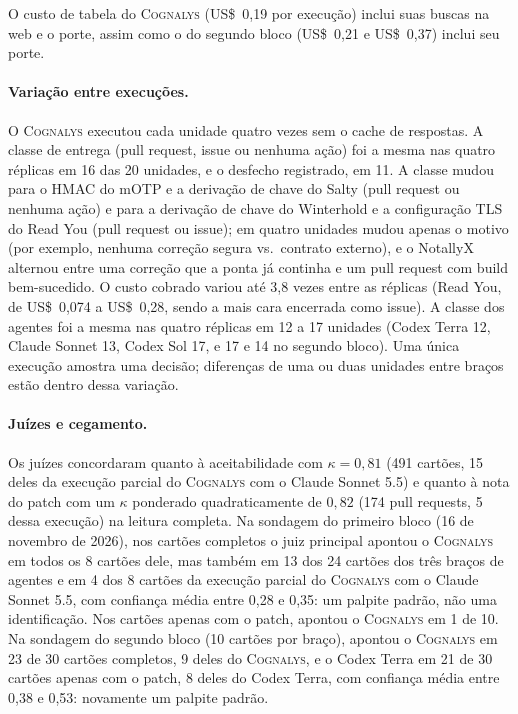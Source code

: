 \documentclass[conference]{IEEEtran}
\newcommand{\system}{\textsc{Cognalys}}
\begin{document}
O custo de tabela do \system{}
(US\$~0,19 por execução) inclui suas buscas na web e o porte, assim como o do segundo bloco
(US\$~0,21 e US\$~0,37) inclui seu porte.

\paragraph{Variação entre execuções.} O \system{} executou cada unidade quatro vezes sem o
cache de respostas. A classe de entrega (pull request, issue ou nenhuma ação) foi a
mesma nas quatro réplicas em 16 das 20 unidades, e o desfecho registrado, em
11. A classe mudou para o HMAC do mOTP e a derivação de chave do Salty (pull request
ou nenhuma ação) e para a derivação de chave do Winterhold e a configuração TLS do Read You (pull
request ou issue); em quatro unidades mudou apenas o motivo (por exemplo, nenhuma correção segura vs.\
contrato externo), e o NotallyX alternou entre uma correção que a ponta já continha e um
pull request com build bem-sucedido. O custo cobrado variou até 3,8 vezes entre as réplicas
(Read You, de US\$~0,074 a US\$~0,28, sendo a mais cara encerrada como issue).
A classe dos agentes foi a mesma nas quatro réplicas em 12 a 17 unidades
(Codex Terra 12, Claude Sonnet 13, Codex Sol 17, e 17 e 14 no segundo
bloco). Uma única execução amostra uma
decisão; diferenças de uma ou duas unidades entre braços estão dentro dessa
variação.

\paragraph{Juízes e cegamento.} Os juízes concordaram quanto à aceitabilidade com
$\kappa = 0{,}81$ (491 cartões, 15 deles da execução parcial do \system{} com o Claude
Sonnet 5.5) e quanto à nota do patch com um $\kappa$ ponderado quadraticamente
de $0{,}82$ (174 pull requests, 5 dessa execução) na leitura completa. Na sondagem do primeiro bloco
(16 de novembro de 2026), nos cartões completos o juiz principal apontou o \system{} em
todos os 8 cartões dele, mas também em 13 dos 24 cartões dos três braços de agentes e em 4
dos 8 cartões da execução parcial do \system{} com o Claude Sonnet 5.5, com confiança média
entre 0,28 e 0,35: um palpite padrão, não uma identificação. Nos cartões apenas com o patch, apontou o
\system{} em 1 de 10. Na sondagem do segundo bloco (10 cartões por braço), apontou o \system{} em 23 de
30 cartões completos, 9 deles do \system{}, e o Codex Terra em 21 de 30 cartões apenas com o patch,
8 deles do Codex Terra, com confiança média entre 0,38 e 0,53:
novamente um palpite padrão.
\end{document}
